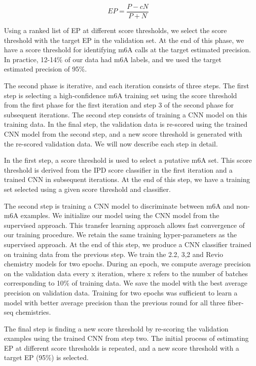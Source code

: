 \documentclass{article}
\begin{document}
\begin{equation}
EP = \frac{P - cN}{P + N} 
\end{equation}

Using a ranked list of EP at different score thresholds, we select the score threshold with the target EP in the validation set.  At the end of this phase, we have a score threshold for identifying m6A calls at the target estimated precision. In practice, 12-14\% of our data had m6A labels, and we used the target estimated precision of 95\%.  

The second phase is iterative, and each iteration consists of three steps. The first step is selecting a high-confidence m6A training set using the score threshold from the first phase for the first iteration and step 3 of the second phase for subsequent iterations. The second step consists of training a CNN model on this training data. In the final step, the validation data is re-scored using the trained CNN model from the second step, and a new score threshold is generated with the re-scored validation data. We will now describe each step in detail. 

In the first step, a score threshold is used to select a putative m6A set. This score threshold is derived from the IPD score classifier in the first iteration and a trained CNN in subsequent iterations. At the end of this step, we have a training set selected using a given score threshold and classifier. 

The second step is training a CNN model to discriminate between m6A and non-m6A examples. We initialize our model using the CNN model from the supervised approach. This transfer learning approach allows fast convergence of our training procedure. We retain the same training hyper-parameters as the supervised approach. At the end of this step, we produce a CNN classifier trained on training data from the previous step. We train the 2.2, 3,2 and Revio chemistry models for two epochs.  During an epoch, we compute average precision on the validation data every x iteration, where x refers to the number of batches corresponding to 10\% of training data. We save the model with the best average precision on validation data. Training for two epochs was sufficient to learn a model with better average precision than the previous round for all three fiber-seq chemistries.

The final step is finding a new score threshold by re-scoring the validation examples using the trained CNN from step two. The initial process of estimating EP at different score thresholds is repeated, and a new score threshold with a target EP (95\%) is selected. 
\end{document}
